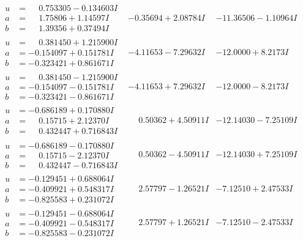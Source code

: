 \documentclass[1p]{elsarticle_modified}
\theoremstyle{definition}
\begin{document}
$$\begin{array}{c|c|c}
\begin{aligned}
u &= \phantom{-}0.753305 - 0.134603 I \\
a &= \phantom{-}1.75806 + 1.14597 I \\
b &= \phantom{-}1.39356 + 0.37494 I\end{aligned}
 & -0.35694 + 2.08784 I & -11.36506 - 1.10964 I \\ \hline\begin{aligned}
u &= \phantom{-}0.381450 + 1.215900 I \\
a &= -0.154097 + 0.151781 I \\
b &= -0.323421 + 0.861671 I\end{aligned}
 & -4.11653 - 7.29632 I & -12.0000 + 8.2173 I \\ \hline\begin{aligned}
u &= \phantom{-}0.381450 - 1.215900 I \\
a &= -0.154097 - 0.151781 I \\
b &= -0.323421 - 0.861671 I\end{aligned}
 & -4.11653 + 7.29632 I & -12.0000 - 8.2173 I \\ \hline\begin{aligned}
u &= -0.686189 + 0.170880 I \\
a &= \phantom{-}0.15715 + 2.12370 I \\
b &= \phantom{-}0.432447 + 0.716843 I\end{aligned}
 & \phantom{-}0.50362 + 4.50911 I & -12.14030 - 7.25109 I \\ \hline\begin{aligned}
u &= -0.686189 - 0.170880 I \\
a &= \phantom{-}0.15715 - 2.12370 I \\
b &= \phantom{-}0.432447 - 0.716843 I\end{aligned}
 & \phantom{-}0.50362 - 4.50911 I & -12.14030 + 7.25109 I \\ \hline\begin{aligned}
u &= -0.129451 + 0.688064 I \\
a &= -0.409921 + 0.548317 I \\
b &= -0.825583 + 0.231072 I\end{aligned}
 & \phantom{-}2.57797 - 1.26521 I & -7.12510 + 2.47533 I \\ \hline\begin{aligned}
u &= -0.129451 - 0.688064 I \\
a &= -0.409921 - 0.548317 I \\
b &= -0.825583 - 0.231072 I\end{aligned}
 & \phantom{-}2.57797 + 1.26521 I & -7.12510 - 2.47533 I \\ \hline\begin{aligned}

\end{aligned}
\end{array}$$
\end{document}
